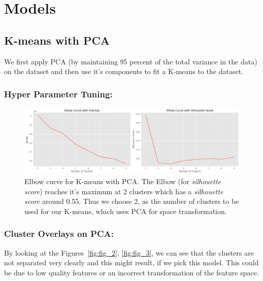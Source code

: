\documentclass[a4paper,12pt]{article}
\begin{document}

\section{Models}

\subsection{K-means with PCA}
We first apply PCA (by maintaining 95 percent of the total variance in the data) on the dataset and then use it's components to fit a K-means to the dataset.  

\subsubsection{Hyper Parameter Tuning:}
\begin{figure}[H]
    \centering
    \includegraphics[width=1\textwidth]{./images/elbow_kmeans_pca.png}
    \caption{Elbow curve for K-means with PCA. The Elbow (for \textit{silhouette score}) reaches it's maximum at 2 clusters which has a \textit{silhouette score} around 0.55. 
    Thus we choose 2, as the number of clusters to be used for our K-means, which uses PCA for space transformation.}
    \label{fig:fig_1}
\end{figure}

\newpage

\subsubsection{Cluster Overlays on PCA:}
By looking at the Figures~\ref{fig:fig_2}, \ref{fig:fig_3}, we can see that the clusters are not separated very clearly and this might result, if we pick this model. 
This could be due to low quality features or an incorrect transformation of the feature space. \\ 
\end{document}
